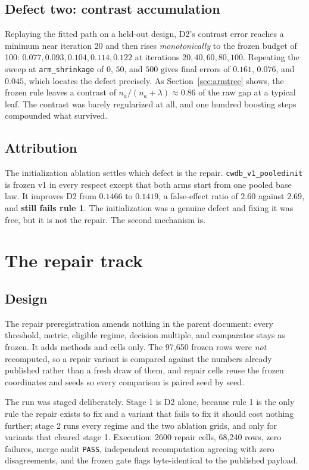 \documentclass[11pt,a4paper]{article}
\theoremstyle{definition}
\theoremstyle{remark}
\begin{document}
\subsection{Defect two: contrast accumulation}

Replaying the fitted path on a held-out design, D2's contrast error reaches a
minimum near iteration 20 and then rises \emph{monotonically} to the frozen
budget of 100: $0.077, 0.093, 0.104, 0.114, 0.122$ at iterations
$20, 40, 60, 80, 100$. Repeating the sweep at \texttt{arm\_shrinkage} of $0$,
$50$, and $500$ gives final errors of $0.161$, $0.076$, and $0.045$, which
locates the defect precisely. As Section~\ref{sec:armtree} shows, the frozen rule
leaves a contrast of $n_a/(n_a+\lambda) \approx 0.86$ of the raw gap at a typical
leaf. The contrast was barely regularized at all, and one hundred boosting steps
compounded what survived.

\subsection{Attribution}

The initialization ablation settles which defect is the repair.
\texttt{cwdb\_v1\_pooledinit} is frozen v1 in every respect except that both arms
start from one pooled base law. It improves D2 from $0.1466$ to $0.1419$, a
false-effect ratio of $2.60$ against $2.69$, and \textbf{still fails rule 1}. The
initialization was a genuine defect and fixing it was free, but it is not the
repair. The second mechanism is.

\section{The repair track}
\label{sec:repair}

\subsection{Design}

The repair preregistration amends nothing in the parent document: every
threshold, metric, eligible regime, decision multiple, and comparator stays as
frozen. It adds methods and cells only. The 97{,}650 frozen rows were \emph{not}
recomputed, so a repair variant is compared against the numbers already
published rather than a fresh draw of them, and repair cells reuse the frozen
coordinates and seeds so every comparison is paired seed by seed.

The run was staged deliberately. Stage 1 is D2 alone, because rule 1 is the only
rule the repair exists to fix and a variant that fails to fix it should cost
nothing further; stage 2 runs every regime and the two ablation grids, and only
for variants that cleared stage 1. Execution: 2600 repair cells, 68{,}240 rows,
zero failures, merge audit \texttt{PASS}, independent recomputation agreeing with
zero disagreements, and the frozen gate flags byte-identical to the published
payload.
\end{document}
